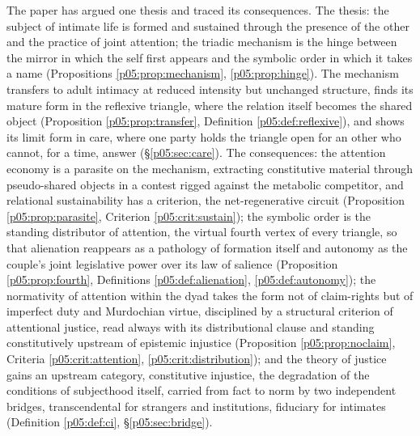 The paper has argued one thesis and traced its consequences. The thesis: the subject of intimate life is formed and sustained through the presence of the other and the practice of joint attention; the triadic mechanism is the hinge between the mirror in which the self first appears and the symbolic order in which it takes a name (Propositions \ref{p05:prop:mechanism}, \ref{p05:prop:hinge}). The mechanism transfers to adult intimacy at reduced intensity but unchanged structure, finds its mature form in the reflexive triangle, where the relation itself becomes the shared object (Proposition \ref{p05:prop:transfer}, Definition \ref{p05:def:reflexive}), and shows its limit form in care, where one party holds the triangle open for an other who cannot, for a time, answer (§\ref{p05:sec:care}). The consequences: the attention economy is a parasite on the mechanism, extracting constitutive material through pseudo-shared objects in a contest rigged against the metabolic competitor, and relational sustainability has a criterion, the net-regenerative circuit (Proposition \ref{p05:prop:parasite}, Criterion \ref{p05:crit:sustain}); the symbolic order is the standing distributor of attention, the virtual fourth vertex of every triangle, so that alienation reappears as a pathology of formation itself and autonomy as the couple's joint legislative power over its law of salience (Proposition \ref{p05:prop:fourth}, Definitions \ref{p05:def:alienation}, \ref{p05:def:autonomy}); the normativity of attention within the dyad takes the form not of claim-rights but of imperfect duty and Murdochian virtue, disciplined by a structural criterion of attentional justice, read always with its distributional clause and standing constitutively upstream of epistemic injustice (Proposition \ref{p05:prop:noclaim}, Criteria \ref{p05:crit:attention}, \ref{p05:crit:distribution}); and the theory of justice gains an upstream category, constitutive injustice, the degradation of the conditions of subjecthood itself, carried from fact to norm by two independent bridges, transcendental for strangers and institutions, fiduciary for intimates (Definition \ref{p05:def:ci}, §\ref{p05:sec:bridge}).

